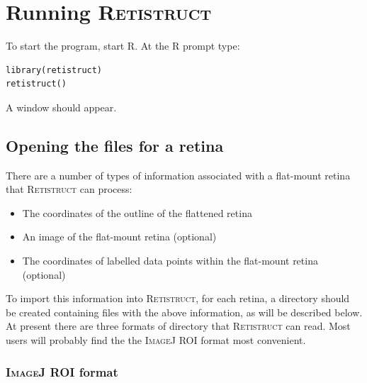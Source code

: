\documentclass{article}
\begin{document}
\section{Running \textsc{Retistruct}}
\label{manual:sec:running}

To start the program, start \textsc{R}. At the \textsc{R} prompt type:

\begin{verbatim}
library(retistruct)
retistruct()
\end{verbatim}
A window should appear.

\subsection{Opening the files for a retina}
\label{manual:sec:opening-files-retina}

There are a number of types of information associated with a
flat-mount retina that \textsc{Retistruct} can process:
\begin{itemize}
\item The coordinates of the outline of the flattened retina
\item An image of the flat-mount retina (optional)
\item The coordinates of labelled data points within the flat-mount
  retina (optional)
\end{itemize}
To import this information into \textsc{Retistruct}, for each retina,
a directory should be created containing files with the above
information, as will be described below.  At present there are three
formats of directory that \textsc{Retistruct} can read.  Most users
will probably find the the \textsc{ImageJ} ROI format most convenient.

\subsubsection{\textsc{ImageJ} ROI format}
\label{retistruct-manual:sec:ijroi-format}
\end{document}
